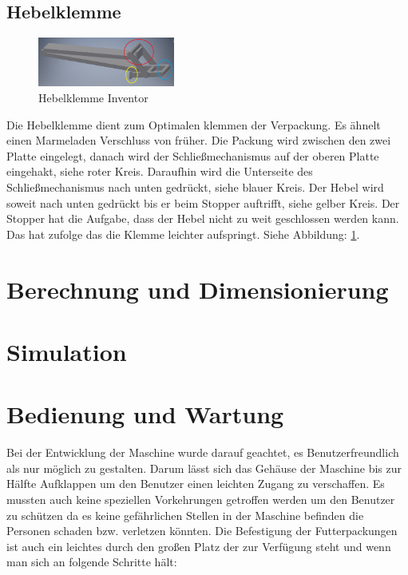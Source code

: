 \subsection{Hebelklemme}

\begin{figure}
\vspace{-20pt}
  \begin{center}
    \includegraphics[width=0.40\textwidth]{Bilder/Inventor/Hebel_Klemme}
  \end{center}
  \caption{Hebelklemme Inventor}
  \label{Hebel_Klemme_Inventor}
  \vspace{-10pt}
\end{figure}

Die Hebelklemme dient zum Optimalen klemmen der Verpackung.
Es ähnelt einen Marmeladen Verschluss von früher. Die Packung wird zwischen den zwei Platte eingelegt, danach wird der Schließmechanismus auf der oberen Platte eingehakt, siehe roter Kreis. Daraufhin wird die Unterseite des Schließmechanismus nach unten gedrückt, siehe blauer Kreis.
Der Hebel wird soweit nach unten gedrückt bis er beim Stopper auftrifft, siehe gelber Kreis. Der Stopper hat die Aufgabe, dass der Hebel nicht zu weit geschlossen werden kann. Das hat zufolge das die Klemme leichter aufspringt. Siehe Abbildung: \ref{Hebel_Klemme_Inventor}.

\section{Berechnung und Dimensionierung}
\section{Simulation}	
\section{Bedienung und Wartung}

Bei der Entwicklung der Maschine wurde darauf geachtet, es Benutzerfreundlich als nur möglich zu gestalten. Darum lässt sich das Gehäuse der Maschine bis zur Hälfte Aufklappen um den Benutzer einen leichten Zugang zu verschaffen. Es mussten auch keine speziellen Vorkehrungen getroffen werden um den Benutzer zu schützen da es keine gefährlichen Stellen in der Maschine befinden die Personen schaden bzw. verletzen könnten. Die Befestigung der Futterpackungen ist auch ein leichtes durch den großen Platz der zur Verfügung steht und wenn man sich an folgende Schritte hält: 

